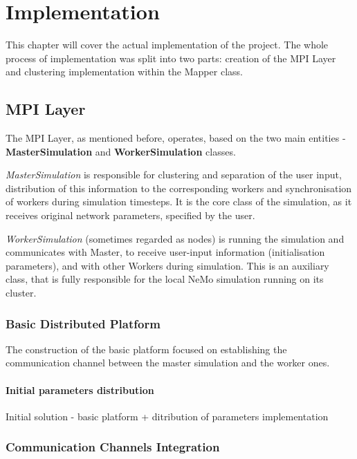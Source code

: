 \chapter{Implementation}

This chapter will cover the actual implementation of the project. The whole process of implementation was split into two parts: creation of the MPI Layer and clustering implementation within the Mapper class.

\section{MPI Layer}

The MPI Layer, as mentioned before, operates, based on the two main entities - \textbf{MasterSimulation} and \textbf{WorkerSimulation} classes.

\emph{MasterSimulation} is responsible for clustering and separation of the user input, distribution of this information to the corresponding workers and synchronisation of workers during simulation timesteps. It is the core class of the simulation, as it receives original network parameters, specified by the user.

\emph{WorkerSimulation} (sometimes regarded as nodes) is running the simulation and communicates with Master, to receive user-input information (initialisation parameters), and with other Workers during simulation. This is an auxiliary class, that is fully responsible for the local NeMo simulation running on its cluster.

\subsection{Basic Distributed Platform}

The construction of the basic platform focused on establishing the communication channel between the master simulation and the worker ones. 

\subsubsection{Initial parameters distribution}

Initial solution - basic platform + ditribution of parameters implementation

\subsection{Communication Channels Integration}

